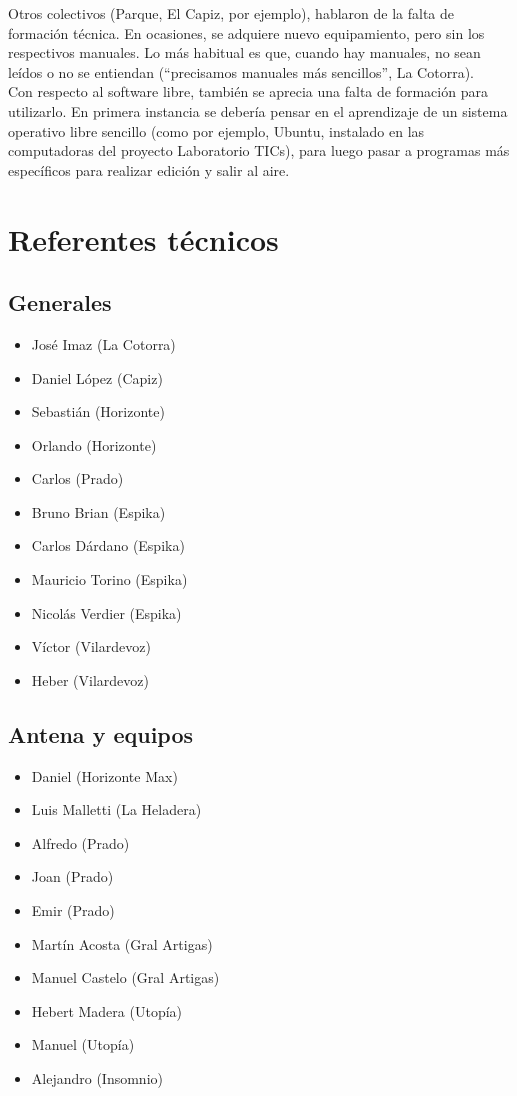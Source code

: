 \indent Otros colectivos (Parque, El Capiz, por ejemplo), hablaron de la falta de formación técnica. En ocasiones, se adquiere nuevo equipamiento, pero sin los respectivos manuales. Lo más habitual es que, cuando hay manuales, no sean leídos o no se entiendan (``precisamos manuales más sencillos'', La Cotorra).\\

\indent Con respecto al software libre, también se aprecia una falta de formación para utilizarlo. En primera instancia se debería pensar en el aprendizaje de un sistema operativo libre sencillo (como por ejemplo, Ubuntu, instalado en las computadoras del proyecto Laboratorio TICs), para luego pasar a programas más específicos para realizar edición y salir al aire.\\

\newpage
\section{Referentes técnicos}

\subsection{Generales}

\begin{itemize}
 \item José Imaz (La Cotorra)
 \item Daniel López (Capiz)
 \item Sebastián (Horizonte)
 \item Orlando (Horizonte)
 \item Carlos (Prado)
 \item Bruno Brian (Espika)
 \item Carlos Dárdano (Espika)
 \item Mauricio Torino (Espika)
 \item Nicolás Verdier (Espika)
 \item Víctor (Vilardevoz)
 \item Heber (Vilardevoz)
\end{itemize}


\subsection{Antena y equipos}
\begin{itemize}
 \item Daniel (Horizonte Max)
 \item Luis Malletti (La Heladera)
 \item Alfredo (Prado)
 \item Joan (Prado)
 \item Emir (Prado)
 \item Martín Acosta (Gral Artigas)
 \item Manuel Castelo (Gral Artigas)
 \item Hebert Madera (Utopía)
 \item Manuel (Utopía)
 \item Alejandro (Insomnio)
\end{itemize}

